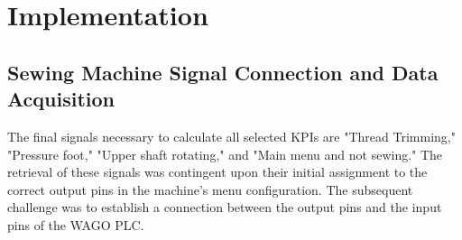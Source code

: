 \clearpage
\chapter{\textbf{Implementation}}\label{Implementation}
\section{Sewing Machine Signal Connection and Data Acquisition}
The final signals necessary to calculate all selected KPIs are "Thread Trimming," "Pressure foot," "Upper shaft rotating," and "Main menu and not sewing." The retrieval of these signals was contingent upon their initial assignment to the correct output pins in the machine's menu configuration. The subsequent challenge was to establish a connection between the output pins and the input pins of the WAGO PLC.


